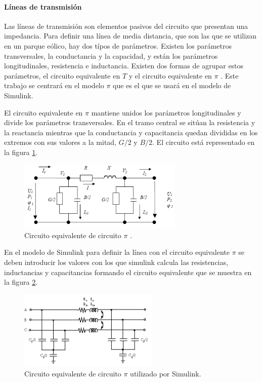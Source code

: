 \documentclass{book}
\begin{document}
		\paragraph {L\'ineas de transmisi\'on}

Las l\'ineas de transmisi\'on son elementos pasivos del circuito que presentan una impedancia. Para definir una l\'inea de media distancia, que son las que se utilizan en un parque e\'olico, hay dos t\'ipos de par\'ametros. Existen los par\'ametros transversales, la conductancia y la capacidad, y est\'an los  par\'ametros longitudinales, resistencia e inductancia. Existen dos formas de agrupar estos par\'ametros, el circuito equivalente en $T$ y el circuito equivalente en $\pi$ \cite{LibroRedesLineas}. Este trabajo se centrar\'a en el modelo $\pi$ que es el que se usar\'a en el modelo de Simulink.  \par

El circuito equivalente en $\pi$ mantiene unidos los par\'ametros longitudinales y divide los par\'ametros transversales. En el tramo central se sit\'uan la resistencia y la reactancia mientras que la conductancia y capacitancia quedan divididas en los extremos con sus valores a la mitad, $G/2$ y $B/2$. El circuito est\'a representado en la figura \ref{CircuitoPi}. \par 

\begin{figure}[h!]
\centering
\includegraphics[width=0.7\textwidth]{CircuitoPi.PNG}
\caption{Circuito equivalente de circuito $\pi$ \cite{LibroRedesLineas}. }
\label{CircuitoPi}
\end{figure} \par

En el modelo de Simulink para definir la l\'inea con el circuito equivalente  $\pi$ se deben introducir los valores con los que simulink calcula las resistencias, inductancias y capacitancias formando el circuito equivalente que se muestra en la figura \ref{PiSectionSimulink}.  \par 

\begin{figure}[h!]
\centering
\includegraphics[width=0.6\textwidth]{PiSectionSimulink.PNG}
\caption{Circuito equivalente de circuito $\pi$ utilizado por Simulink. }
\label{PiSectionSimulink}
\end{figure} \par
\end{document}
